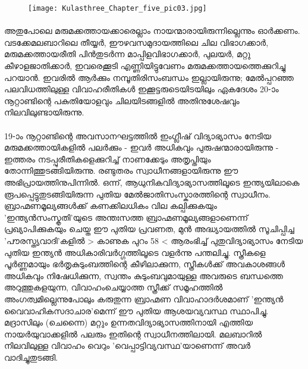 \begin{figure}[h]
\begin{center}
\texttt{[image: Kulasthree\_Chapter\_five\_pic03.jpg]}
\end{center}
\end{figure}

\paragraph{}അതുപോലെ മരുമക്കത്തായക്കാരെല്ലാം നായന്മാരായിരുന്നില്ലെന്നും ഓർക്കണം. വടക്കേമലബാറിലെ തീയ്യർ, ഈഴവസമുദായത്തിലെ ചില വിഭാഗക്കാർ, മരുമക്കത്തായരീതി പിൻതുടർന്ന മാപ്പിളവിഭാഗക്കാർ, പുലയർ, മറ്റു കീഴാളജാതിക്കാർ, ഇവരെക്കൂടി എണ്ണിയിട്ടുവേണം മരുമക്കത്തായത്തെക്കുറിച്ചു പറയാൻ. ഇവരിൽ ആർക്കും നമ്പൂതിരിസംബന്ധം ഇല്ലായിരുന്നു; മേൽപ്പറഞ്ഞ പലവിധത്തിലുള്ള വിവാഹരീതികൾ ഇക്കൂട്ടരുടെയിടയിലും ഏകദേശം 20-ാം നൂറ്റാണ്ടിന്റെ പകുതിയോളവും ചിലയിടങ്ങളിൽ അതിനുശേഷവും നിലവിലുണ്ടായിരുന്നു.

\paragraph{}19-ാം നൂറ്റാണ്ടിന്റെ അവസാനഘട്ടത്തിൽ ഇംഗ്ലീഷ് വിദ്യാഭ്യാസം നേടിയ മരുമക്കത്തായികളിൽ പലർക്കും - ഇവർ അധികവും പുരുഷന്മാരായിരുന്നു - ഇത്തരം നടപ്പുരീതികളെക്കുറിച്ച് നാണക്കേടും അതൃപ്തിയും തോന്നിത്തുടങ്ങിയിരുന്നു. രണ്ടുതരം സ്വാധീനങ്ങളായിരുന്നു ഈ അഭിപ്രായത്തിനുപിന്നിൽ. ഒന്ന്, ആധുനികവിദ്യാഭ്യാസത്തിലൂടെ ഇന്ത്യയിലാകെ രൂപപ്പെട്ടുതുടങ്ങിയിരുന്ന പുതിയ മേൽജാതിസംസ്കാരത്തിന്റെ സ്വാധീനം. ബ്രാഹ്മണമൂല്യങ്ങൾക്ക് കണക്കിലധികം വില കല്പിക്കുകയും 'ഇന്ത്യൻസംസ്കൃതി'യുടെ അന്തഃസത്ത ബ്രാഹ്മണമൂല്യങ്ങളാണെന്ന് പ്രഖ്യാപിക്കുകയും ചെയ്ത ഈ പുതിയ പ്രവണത, മുൻ അദ്ധ്യായത്തിൽ സൂചിപ്പിച്ച 'പൗരസ്ത്യവാദി'കളിൽ > കാണുക പുറം 58 < ആരംഭിച്ച് പുതുവിദ്യാഭ്യാസം നേടിയ പുതിയ ഇന്ത്യൻ അധികാരിവർഗ്ഗത്തിലൂടെ വളർന്നു പന്തലിച്ചു. സ്ത്രീകളെ പൂർണ്ണമായും ഭർതൃകുടുംബത്തിന്റെ കീഴിലാക്കുന്ന, സ്ത്രീകൾക്ക് അവകാശങ്ങൾ അധികവും നിഷേധിക്കുന്ന, സ്വന്തം കുടുംബവുമായുള്ള അവരുടെ ബന്ധത്തെ അറുത്തുകളയുന്ന, വിവാഹംചെയ്യാത്ത സ്ത്രീക്ക് സമൂഹത്തിൽ അംഗത്വമില്ലെന്നുപോലും കരുതുന്ന ബ്രാഹ്മണ വിവാഹാദർശമാണ് 'ഇന്ത്യൻ വൈവാഹികസദാചാര'മെന്ന് ഈ പുതിയ ആശയവ്യവസ്ഥ സ്ഥാപിച്ചു. മദ്രാസിലും (ചെന്നൈ) മറ്റും ഉന്നതവിദ്യാഭ്യാസത്തിനായി എത്തിയ നായർയുവാക്കളിൽ പലരും ഇതിന്റെ സ്വാധീനത്തിലായി. മലബാറിൽ നിലവിലുള്ള വിവാഹം വെറും 'വെപ്പാട്ടിവ്യവസ്ഥ'യാണെന്ന് അവർ വാദിച്ചുതുടങ്ങി.




